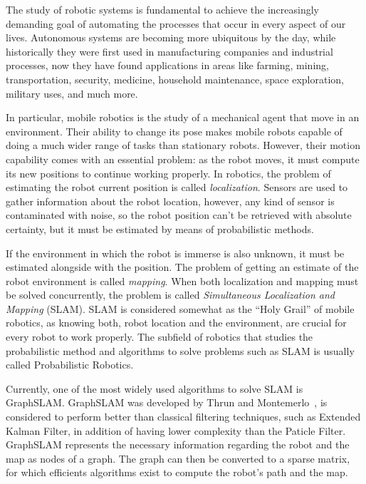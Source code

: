 The study of robotic systems is fundamental to achieve the increasingly demanding goal of automating the processes that occur in every aspect of our lives. Autonomous systems are becoming more ubiquitous by the day, while historically they were first used in manufacturing companies and industrial processes, now they have found applications in areas like farming, mining, transportation, security, medicine, household maintenance, space exploration, military uses, and much more.

In particular, mobile robotics is the study of a mechanical agent that move in an environment. Their ability to change its pose makes mobile robots capable of doing a much wider range of tasks than stationary robots. However, their motion capability comes with an essential problem: as the robot moves, it must compute its new positions to continue working properly. In robotics, the problem of estimating the robot current position is called \textit{localization}. Sensors are used to gather information about the robot location, however, any kind of sensor is contaminated with noise, so the robot position can't be retrieved with absolute certainty, but it must be estimated by means of probabilistic methods.  


If the environment in which the robot is immerse is also unknown, it must be estimated alongside with the position. The problem of getting an estimate of the robot environment is called \textit{mapping}. When both localization and mapping must be solved concurrently, the problem is called \textit{Simultaneous Localization and Mapping} (SLAM). SLAM is considered somewhat as the ``Holy Grail'' of mobile robotics, as knowing both, robot location and the environment, are crucial for every robot to work properly. The subfield of robotics that studies the probabilistic method and algorithms to solve problems such as SLAM is usually called Probabilistic Robotics.

Currently, one of the most widely used algorithms to solve SLAM is GraphSLAM. GraphSLAM was developed by Thrun and Montemerlo~\cite{graphslam}, is considered to perform better than classical filtering techniques, such as Extended Kalman Filter, in addition of having lower complexity than the Paticle Filter. GraphSLAM represents the necessary information regarding the robot and the map as nodes of a graph. The graph can then be converted to a sparse matrix, for which efficients algorithms exist to compute the robot's path and the map. 


